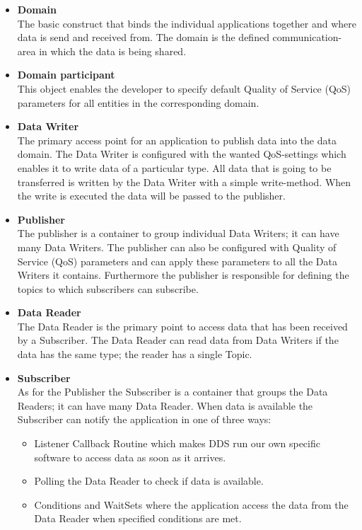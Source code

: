 \documentclass[Main]{subfiles}
\begin{document}
\begin{itemize}
  \item \textbf{Domain}\\The basic construct that binds the individual applications together and where data is send and received from. The domain is the defined communication-area in which the data is being shared.
  \item \textbf{Domain participant}\\This object enables the developer to specify default Quality of Service (QoS) parameters for all entities in the corresponding domain.
  \item \textbf{Data Writer}\\The primary access point for an application to publish data into the data domain. The Data Writer is configured with the wanted QoS-settings which enables it to write data of a particular type. All data that is going to be transferred is written by the Data Writer with a simple write-method. When the write is executed the data will be passed to the publisher. 
  \item \textbf{Publisher}\\The publisher is a container to group individual Data Writers; it can have many Data Writers. The publisher can also be configured with Quality of Service (QoS) parameters and can apply these parameters to all the Data Writers it contains. Furthermore the publisher is responsible for defining the topics to which subscribers can subscribe.
  \item \textbf{Data Reader}\\The Data Reader is the primary point to access data that has been received by a Subscriber. The Data Reader can read data from Data Writers if the data has the same type; the reader has a single Topic.
  \item \textbf{Subscriber}\\As for the Publisher the Subscriber is a container that groups the Data Readers; it can have many Data Reader. When data is available the Subscriber can notify the application in one of three ways:
  
  \begin{itemize}
  \item Listener Callback Routine which makes DDS run our own specific software to access data as soon as it arrives.

  \item Polling the Data Reader to check if data is available.

  \item Conditions and WaitSets where the application access the data from the Data Reader when specified conditions are met.
  \end{itemize}


\end{itemize}
\end{document}
